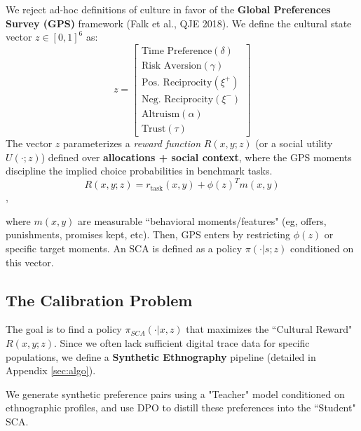 \documentclass[11pt]{article}
\theoremstyle{plain}
\theoremstyle{definition}
\theoremstyle{remark}
\newcommand{\1}{\mathbf{1}}
\begin{document}
We reject ad-hoc definitions of culture in favor of the \textbf{Global Preferences Survey (GPS)} framework (Falk et al., QJE 2018). We define the cultural state vector $z \in [0,1]^6$ as:
\begin{equation}
    z = \begin{bmatrix} 
    \text{Time Preference} (\delta) \\ 
    \text{Risk Aversion} (\gamma) \\ 
    \text{Pos. Reciprocity} (\xi^+) \\ 
    \text{Neg. Reciprocity} (\xi^-) \\ 
    \text{Altruism} (\alpha) \\ 
    \text{Trust} (\tau)
    \end{bmatrix}
\end{equation}
The vector $z$ parameterizes a \textit{reward function} $R(x,y;z)$ (or a social utility $U(\cdot;z)$) defined over \textbf{allocations + social context}, where the GPS moments discipline the implied choice probabilities in benchmark tasks.
\[
R(x,y;z) = r_{\text{task}} (x,y) + \phi(z)^T m(x,y)
\],

where $m(x,y)$ are measurable ``behavioral moments/features" (eg, offers, punishments, promises kept, etc). Then, GPS enters by restricting $\phi(z)$ or specific target moments. An SCA is defined as a policy $\pi(\cdot|s; z)$ conditioned on this vector.

\subsection{The Calibration Problem}
The goal is to find a policy $\pi_{SCA}(\cdot | x, z)$ that maximizes the ``Cultural Reward" $R(x, y; z)$. Since we often lack sufficient digital trace data for specific populations, we define a \textbf{Synthetic Ethnography} pipeline (detailed in Appendix \ref{sec:algo}).

We generate synthetic preference pairs using a "Teacher" model conditioned on ethnographic profiles, and use DPO to distill these preferences into the ``Student" SCA.
\end{document}
